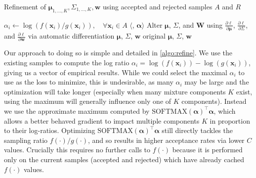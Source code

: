 \documentclass{ecai}  %
\begin{document}
%
%
%
\begin{algorithm}[H]
\caption{Refinement of $\bm{\mu}_{1, \ldots, K}, \Sigma_{1, \ldots, K}, \bm{w}$ using accepted and rejected samples $A$ and $R$} \label{algo:refine}
\begin{algorithmic}[1]
    \State $\alpha_i \gets \log(f(\bm{x}_i)/g(\bm{x}_i)), \quad \forall \bm{x}_i \in A$
    \State \Return $\langle$, $\bm{\alpha}\rangle$
\EndProcedure
{}
    \State Alter $\bm{\mu}$, $\Sigma$, and $\bm{W}$ using $\frac{\partial \ell}{\partial \bm{\mu}}$, $\frac{\partial \ell}{\partial \Sigma}$, and  $\frac{\partial \ell}{\partial \bm{w}}$ via automatic differentiation 
        \State \Return $\bm{\mu}$, $\Sigma$, $\bm{w}$
    \EndIf
\EndWhile
\State \Return original  $\bm{\mu}$, $\Sigma$, $\bm{w}$
\end{algorithmic}
\end{algorithm}
%
%

Our approach to doing so is simple and detailed in \autoref{algo:refine}. We use the existing samples to compute the log ratio $\alpha_i = \log(f(\bm{x}_i))-\log(g(\bm{x}_i))$, giving us a vector of empirical results. While we could select the maximal $\alpha_i$ to use as the loss to minimize, this is undesirable, as many $\alpha_i$ may be large and the optimization will take longer (especially when many mixture components $K$ exist, using the maximum will generally influence only one of $K$ components). Instead we use the approximate maximum computed by $\text{SOFTMAX}(\bm{\alpha})^\top \bm{\alpha}$, which allows a better behaved gradient to impact multiple components $K$ in proportion to their log-ratios. 
Optimizing $\text{SOFTMAX}(\bm{\alpha})^\top \bm{\alpha}$ still directly tackles the sampling ratio $f(\cdot)/g(\cdot)$, and so results in higher acceptance rates via lower $C$ values. Crucially this requires no further calls to $f(\cdot)$ because it is performed only on the current samples (accepted and rejected) which have already cached $f(\cdot)$ values.  
\end{document}
